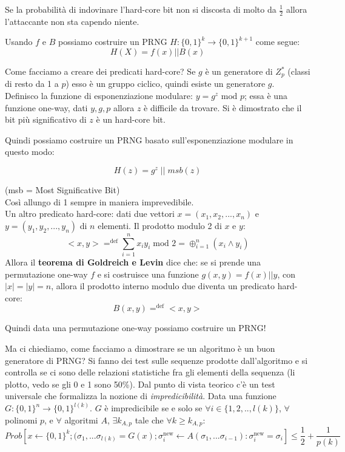 Se la probabilità di indovinare l'hard-core bit non si discosta di molto da $\frac12$ allora l'attaccante non sta capendo niente.

Usando $f$ e $B$ possiamo costruire un PRNG $H:\{0,1\}^k \rightarrow \{0,1\}^{k+1}$ come segue:
\begin{equation*}
H(X) = f(x) || B(x)
\end{equation*}

Come facciamo a creare dei predicati hard-core?
Se $g$ è un generatore di $Z_p^*$ (classi di resto da 1 a $p$) esso è un gruppo ciclico, quindi esiste un generatore $g$. Definisco la funzione di esponenziazione modulare: $y=g^z \text{ mod } p$; essa è una funzione one-way, dati $y, g, p$ allora $z$ è difficile da trovare. Si è dimostrato che il bit più significativo di $z$ è un hard-core bit.

Quindi possiamo costruire un PRNG basato sull'esponenziazione modulare in questo modo:

\begin{equation*}
H(z) = g^z \;||\; msb(z)
\end{equation*}

(msb = Most Significative Bit)\\
Così allungo di 1 sempre in maniera imprevedibile.\\
Un altro predicato hard-core: dati due vettori $x=(x_1, x_2, ..., x_n)$ e $y=(y_1, y_2, ..., y_n)$ di $n$ elementi.
Il prodotto modulo 2 di $x$ e $y$:
\begin{equation*}
<x,y> =^{\text{def}} \sum_{i=1}^nx_iy_i \; \text{mod } 2 = \oplus_{i=1}^n(x_i \land y_i)
\end{equation*}
Allora il \textbf{teorema di Goldreich e Levin} dice che: se si prende una permutazione one-way $f$ e si costruisce una funzione $g(x,y) = f(x) || y$, con $|x| = |y| = n$, allora il prodotto interno modulo due diventa un predicato hard-core:
\begin{equation*}
B(x,y) =^{\text{def}} <x,y>
\end{equation*}

Quindi data una permutazione one-way possiamo costruire un PRNG!

Ma ci chiediamo, come facciamo a dimostrare se un algoritmo è un buon generatore di PRNG? Si fanno dei test sulle sequenze prodotte dall'algoritmo e si controlla se ci sono delle relazioni statistiche fra gli elementi della sequenza (li plotto, vedo se gli 0 e 1 sono 50\%).
Dal punto di vista teorico c'è un test universale che formalizza la nozione di \textit{impredicibilità}.
Data una funzione $G:\{0,1\}^n \rightarrow \{0,1\}^{l(k)}$. $G$ è impredicibile se e solo se $\forall i \in \{1,2,..,l(k)\}$, $\forall$ polinomi $p$, e $\forall$ algoritmi $A$, $\exists k_{A,p}$ tale che $\forall k \geq k_{A,p}:$
\begin{equation*}
Prob[x \leftarrow \{0,1\}^k; (\sigma_1, ...\sigma_{l(k)} = G(x); \sigma^{\text{new}}_i \leftarrow A(\sigma_1,...\sigma_{i-1}) : \sigma^{\text{new}}_i = \sigma_i] \leq \frac12 + \frac1{p(k)}
\end{equation*}


